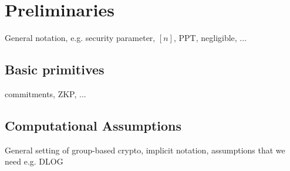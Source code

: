 
\section{Preliminaries}

\begin{todobox}
    General notation, e.g. security parameter, $[n]$, PPT, negligible, ...
\end{todobox}

\subsection{Basic primitives}

\begin{todobox}
    commitments, ZKP, ...
\end{todobox}

\subsection{Computational Assumptions}

\begin{todobox}
    General setting of group-based crypto, implicit notation, assumptions that we need e.g. DLOG 
\end{todobox}